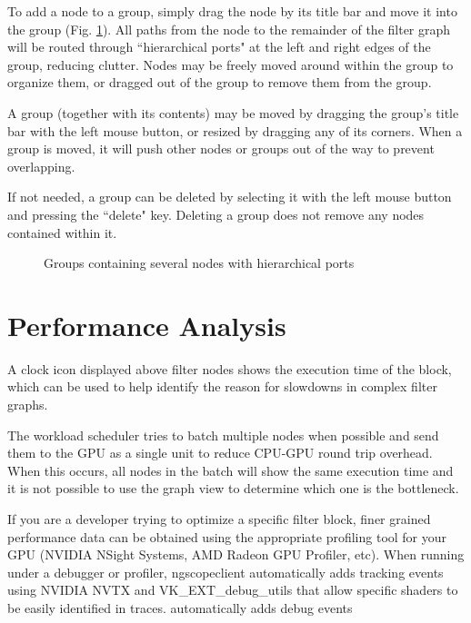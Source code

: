 To add a node to a group, simply drag the node by its title bar and move it into the group (Fig.
\ref{graph-editor-group2}). All paths from the node to the remainder of the filter graph will be routed through
``hierarchical ports" at the left and right edges of the group, reducing clutter. Nodes may be freely moved around
within the group to organize them, or dragged out of the group to remove them from the group.

A group (together with its contents) may be moved by dragging the group's title bar with the left mouse button, or
resized by dragging any of its corners. When a group is moved, it will push other nodes or groups out of the way to
prevent overlapping.

If not needed, a group can be deleted by selecting it with the left mouse button and pressing the ``delete" key.
Deleting a group does not remove any nodes contained within it.

\begin{figure}[H]
\centering
{}
\caption{Groups containing several nodes with hierarchical ports}
\label{graph-editor-group2}
\end{figure}

\section{Performance Analysis}

A clock icon displayed above filter nodes shows the execution time of the block, which can be used to help identify the
reason for slowdowns in complex filter graphs.

The workload scheduler tries to batch multiple nodes when possible and send them to the GPU as a single unit to reduce
CPU-GPU round trip overhead. When this occurs, all nodes in the batch will show the same execution time and it is not
possible to use the graph view to determine which one is the bottleneck.

If you are a developer trying to optimize a specific filter block, finer grained performance data can be obtained using
the appropriate profiling tool for your GPU (NVIDIA NSight Systems, AMD Radeon GPU Profiler, etc). When running under a
debugger or profiler, ngscopeclient automatically adds tracking events using NVIDIA NVTX and VK\_EXT\_debug\_utils that
allow specific shaders to be easily identified in traces.
automatically adds debug events
